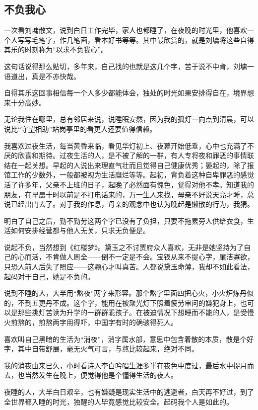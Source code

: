 \subsection{不负我心}

\par 一次看刘墉散文，说到白日工作完毕，家人也都睡了，在夜晚的时光里，他喜欢一个人写写毛笔字，作几笔画，看本好书等等。其中最欣赏的，就是刘墉将这些自得其乐的时刻称为“以求不负我心”。
\par 这句话说得那么贴切，多年来，自己找的也就是这几个字，苦于说不中肯，刘墉一语道出，真是不亦快哉。
\par 自得其乐这回事相信每一个人多少都能体会，独处的时光如果安排得自在，境界想来十分高妙。
\par 无论我住在哪里，总有邻居来说，说睡眠安然，因为我的孤灯一向点到清晨，可以说比“守望相助”站岗亭里的看更人还要值得信赖。
\par 我喜欢过夜生活，每当黄昏来临，看见华灯初上、夜幕开始低垂，心中也充满了不厌的欣喜和期待。过夜生活的人，是不被了解的一群，有人专将夜和罪恶的事情联结在一起关想。早起的人说出来理直气壮而且觉得自己健康优秀；晏起的，除了报馆工作的少数外，一般都被视为生活糜烂等等。起初，背负着这种自卑罪恶的感觉活了许多年，父亲不上班的日子，起晚了必然面有愧色，觉得对他不孝。知道我的朋友，在早晨十时以前是不打电话来的，万一生人来找，母亲不好说天亮才睡，总说已经出门去了。对于我的作息，母亲的观念中也认为晚起是懒散的行为，我猜。
\par 明白了自己之后，勤不勤劳这两个字已没有了负担，只要不拖累旁人供给衣食，生活如何安排经营都与他人无关，只求无负便是。
\par 说起不负，当然想到《红楼梦》。黛玉之不讨贾府众人喜欢，无非是她坚持为了自己的心而活，不肯做人周全——倒不一定是不会。宝钗从来不提心字，廉洁寡欲，只恐人前人后失了照应——这颗心才叫真苦。人都说黛玉命薄，我却不如此看法，起码对于自己，她是不负的。
\par 说到不睡的人，大半用“熬夜”两字来形容。那个熬字里面四把心火，小火炉炼丹似的，不到五更丹不成。这个字，能用在被聚光灯下照着疲劳审问的嫌犯身上，也可以是那些挑灯苦读为升学的一群群乖孩子。在被迫情况下想睡而不能的人，是受慢火煎熬的，煎熬两字用得吓，中国字有时的确骇得死人。
\par 喜欢叫自己黑暗的生活为“消夜”，消字属水部，意思中包含着散的本质，散是个好字，其中自带舒展，毫无火气可言，与熬比较起来，绝对不同。
\par 我的消夜由来已久，小时看诗人李白吟唱生涯多半在夜色中度过，最后水中捉月而去，也当然发生在晚上，便觉得他是个懂得生活的夜人。
\par 夜睡的人，大半白日艰辛，也有嫌疑是现实生活中的逃避者，白天再不好过，到了全世界都入睡的时光，独醒的人毕竟感觉比较安全。起码我个人是如此的。
